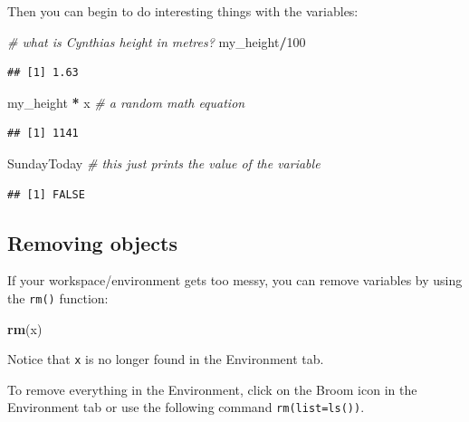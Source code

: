 \documentclass[
]{book}
\newenvironment{Shaded}{\begin{snugshade}}{\end{snugshade}}
\newcommand{\CommentTok}[1]{\textcolor[rgb]{0.56,0.35,0.01}{\textit{#1}}}
\newcommand{\DecValTok}[1]{\textcolor[rgb]{0.00,0.00,0.81}{#1}}
\newcommand{\FunctionTok}[1]{\textcolor[rgb]{0.13,0.29,0.53}{\textbf{#1}}}
\newcommand{\NormalTok}[1]{#1}
\newcommand{\SpecialCharTok}[1]{\textcolor[rgb]{0.81,0.36,0.00}{\textbf{#1}}}
\begin{document}
Then you can begin to do interesting things with the variables:

\begin{Shaded}
\begin{Highlighting}[]
\CommentTok{\# what is Cynthia\textquotesingle{}s height in metres?}
\NormalTok{my\_height}\SpecialCharTok{/}\DecValTok{100}
\end{Highlighting}
\end{Shaded}

\begin{verbatim}
## [1] 1.63
\end{verbatim}

\begin{Shaded}
\begin{Highlighting}[]
\NormalTok{my\_height }\SpecialCharTok{*}\NormalTok{ x }\CommentTok{\# a random math equation }
\end{Highlighting}
\end{Shaded}

\begin{verbatim}
## [1] 1141
\end{verbatim}

\begin{Shaded}
\begin{Highlighting}[]
\NormalTok{SundayToday }\CommentTok{\# this just prints the value of the variable }
\end{Highlighting}
\end{Shaded}

\begin{verbatim}
## [1] FALSE
\end{verbatim}

\subsection{Removing objects}\label{removing-objects}

If your workspace/environment gets too messy, you can remove variables by using the \texttt{rm()} function:

\begin{Shaded}
\begin{Highlighting}[]
\FunctionTok{rm}\NormalTok{(x)}
\end{Highlighting}
\end{Shaded}

Notice that \texttt{x} is no longer found in the Environment tab.

To remove everything in the Environment, click on the Broom icon in the Environment tab or use the following command \texttt{rm(list=ls())}.
\end{document}
